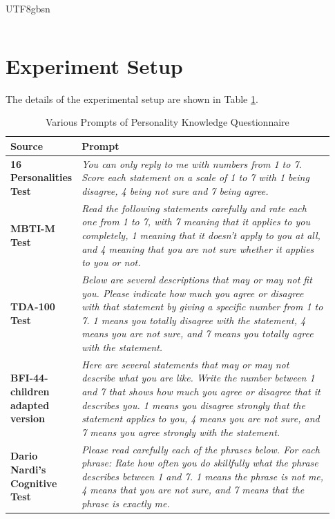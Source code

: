 \documentclass{article}
\theoremstyle{plain}
\theoremstyle{definition}
\theoremstyle{remark}
\begin{document}
\begin{CJK*}{UTF8}{gbsn}
\begin{table}[!htbp]
\begin{tabular}{p{0.35\linewidth} | p{0.58\linewidth}}
\end{tabular}
\vskip -0.1in
\end{table}

\section{Experiment Setup}\label{ap-es}
The details of the experimental setup are shown in Table \ref{table-prompt}.

\begin{table}[h]\small
\caption{\label{table-prompt}
Various Prompts of Personality Knowledge Questionnaire}
\vskip 0.15in
\centering
\begin{tabular}{p{0.14\linewidth} | p{0.79\linewidth}}
\hline
\textbf{Source} & \textbf{Prompt}\\
\hline
\textbf{16 Personalities Test} &  \textit{You can only reply to me with numbers from 1 to 7. Score each statement on a scale of 1 to 7 with 1 being disagree, 4 being not sure and 7 being agree. }  \\
\hline
\textbf{MBTI-M Test} &  \textit{Read the following statements carefully and rate each one from 1 to 7, with 7 meaning that it applies to you completely, 1 meaning that it doesn't apply to you at all, and 4 meaning that you are not sure whether it applies to you or not. }  \\
\hline
\textbf{TDA-100 Test} &  \textit{Below are several descriptions that may or may not fit you. Please indicate how much you agree or disagree with that statement by giving a specific number from 1 to 7. 1 means you totally disagree with the statement, 4 means you are not sure, and 7 means you totally agree with the statement.}  \\
\hline
\textbf{BFI-44-children adapted version} &  \textit{Here are several statements that may or may not describe what you are like. Write the number between 1 and 7 that shows how much you agree or disagree that it describes you. 1 means you disagree strongly that the statement applies to you, 4 means you are not sure, and 7 means you agree strongly with the statement.  }  \\
\hline
\textbf{Dario Nardi’s Cognitive Test} &  \textit{Please read carefully each of the phrases below. For each phrase: Rate how often you do skillfully what the phrase describes between 1 and 7. 1 means the phrase is not me, 4 means that you are not sure, and 7 means that the phrase is exactly me. }  \\
\hline
\end{tabular}
\vskip -0.1in
\end{table}


\end{CJK*}
\end{document}
